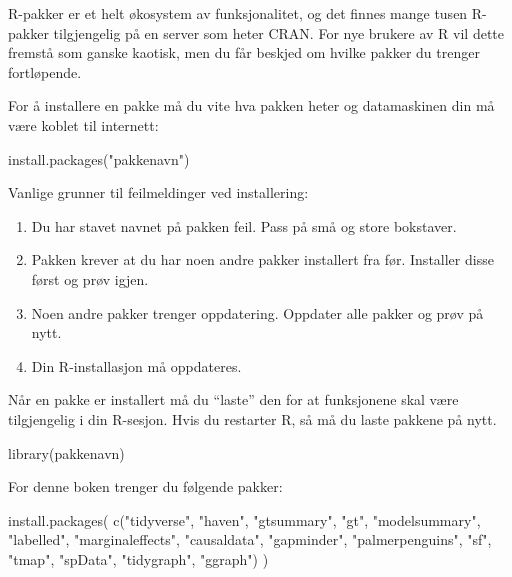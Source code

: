 \documentclass[
  norsk,
  letterpaper,
  DIV=11,
  numbers=noendperiod]{scrreprt}
\newenvironment{Shaded}{\begin{snugshade}}{\end{snugshade}}
\newcommand{\FunctionTok}[1]{\textcolor[rgb]{0.28,0.35,0.67}{#1}}
\newcommand{\NormalTok}[1]{\textcolor[rgb]{0.00,0.23,0.31}{#1}}
\newcommand{\StringTok}[1]{\textcolor[rgb]{0.13,0.47,0.30}{#1}}
\providecommand{\tightlist}{%
  \setlength{\itemsep}{0pt}\setlength{\parskip}{0pt}}
\theoremstyle{definition}
\theoremstyle{remark}
\begin{document}
R-pakker er et helt økosystem av funksjonalitet, og det finnes mange
tusen R-pakker tilgjengelig på en server som heter CRAN. For nye brukere
av R vil dette fremstå som ganske kaotisk, men du får beskjed om hvilke
pakker du trenger fortløpende.

For å installere en pakke må du vite hva pakken heter og datamaskinen
din må være koblet til internett:

\begin{Shaded}
\begin{Highlighting}[]
\FunctionTok{install.packages}\NormalTok{(}\StringTok{"pakkenavn"}\NormalTok{)}
\end{Highlighting}
\end{Shaded}

Vanlige grunner til feilmeldinger ved installering:

\begin{enumerate}
\def\labelenumi{\arabic{enumi})}
\tightlist
\item
  Du har stavet navnet på pakken feil. Pass på små og store bokstaver.
\item
  Pakken krever at du har noen andre pakker installert fra før.
  Installer disse først og prøv igjen.
\item
  Noen andre pakker trenger oppdatering. Oppdater alle pakker og prøv på
  nytt.
\item
  Din R-installasjon må oppdateres.
\end{enumerate}

Når en pakke er installert må du ``laste'' den for at funksjonene skal
være tilgjengelig i din R-sesjon. Hvis du restarter R, så må du laste
pakkene på nytt.

\begin{Shaded}
\begin{Highlighting}[]
\FunctionTok{library}\NormalTok{(pakkenavn)}
\end{Highlighting}
\end{Shaded}

For denne boken trenger du følgende pakker:

\begin{Shaded}
\begin{Highlighting}[]
\FunctionTok{install.packages}\NormalTok{( }\FunctionTok{c}\NormalTok{(}\StringTok{"tidyverse"}\NormalTok{, }\StringTok{"haven"}\NormalTok{, }\StringTok{"gtsummary"}\NormalTok{, }\StringTok{"gt"}\NormalTok{, }\StringTok{"modelsummary"}\NormalTok{,}
                    \StringTok{"labelled"}\NormalTok{, }\StringTok{"marginaleffects"}\NormalTok{,}
                    \StringTok{"causaldata"}\NormalTok{, }\StringTok{"gapminder"}\NormalTok{, }\StringTok{"palmerpenguins"}\NormalTok{,}
                    \StringTok{"sf"}\NormalTok{, }\StringTok{"tmap"}\NormalTok{, }\StringTok{"spData"}\NormalTok{,}
                    \StringTok{"tidygraph"}\NormalTok{, }\StringTok{"ggraph"}\NormalTok{)}
\NormalTok{            )}
\end{Highlighting}
\end{Shaded}
\end{document}
